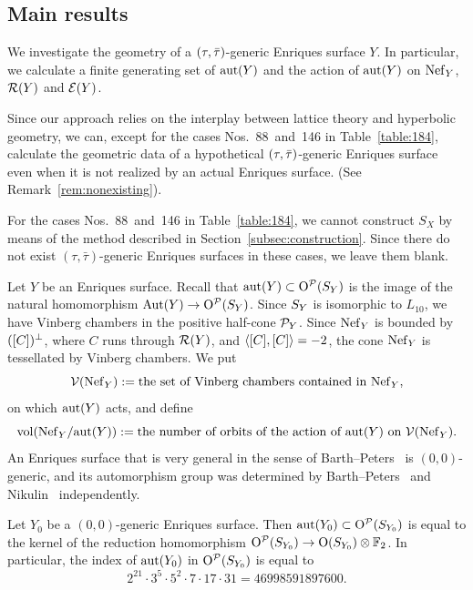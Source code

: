 \documentclass{amsart}
\numberwithin{procedure}{section}
\begin{document}
\subsection{Main results}\label{subsec:mainresults}
%
We investigate the geometry of a $(\tau, \bar{\tau})$-generic Enriques surface $Y$.
In particular, we calculate a finite generating set of $\mathord{\rm{aut}}(Y)$
and the action of $\mathord{\rm{aut}}(Y)$ on $\mathord{\rm Nef}_{Y}$, $\mathord{\mathcal R}(Y)$ and $\mathord{\mathcal E}(Y)$.
%
\begin{remark}\label{rem:nongeometric}
Since our approach relies on the interplay between lattice theory and hyperbolic geometry, %
we can, except for the cases Nos.~88~and~146 in Table~\ref{table:184},
calculate the geometric data of a hypothetical $(\tau, \bar{\tau})$-generic Enriques surface
even when it is not realized by an actual  %
Enriques surface.
(See Remark~\ref{rem:nonexisting}).
\end{remark}
%
\begin{remark}\label{rem:88and146} 
For the cases Nos.~88~and~146 in Table~\ref{table:184},
we cannot construct  $S_X$ by means of the method described in Section~\ref{subsec:construction}.
Since there do not exist $(\tau, \bar\tau)$-generic Enriques surfaces in these cases,
we leave them blank.
\end{remark}
%
Let $Y$ be an Enriques surface.
Recall that $\mathord{\rm{aut}}(Y)\subset  \mathord{\mathrm{O}}^{\mathord{\mathcal P}}(S_{Y})$ 
is the image of the natural homomorphism
$\operatorname{\mathrm{Aut}}\nolimits(Y)\to \mathord{\mathrm{O}}^{\mathord{\mathcal P}}(S_{Y})$.
Since $S_{Y}$ is isomorphic to $L_{10}$,
we have Vinberg chambers in the positive half-cone $\mathord{\mathcal P}_Y$.
Since $\mathord{\rm Nef}_{Y}$ is bounded by
$([C])\sp{\perp}$,
where $C$ runs through $\mathord{\mathcal R}(Y)$, and $\langle [C], [C] \rangle=-2$, 
the cone $\mathord{\rm Nef}_{Y}$ is  tessellated by Vinberg chambers.
We put
\[
\mathord{\mathcal V}(\mathord{\rm Nef}_{Y}):=
\textrm{the set of Vinberg chambers contained in $\mathord{\rm Nef}_{Y}$}, 
\]
on which  $\mathord{\rm{aut}}(Y)$ acts, and define
\[
\mathord{\rm{vol}} (\mathord{\rm Nef}_{Y}/\mathord{\rm{aut}}(Y)):=
\textrm{the number of orbits of the action of $\mathord{\rm{aut}}(Y)$ on 
$\mathord{\mathcal V}(\mathord{\rm Nef}_{Y})$}.
\]
%
An Enriques surface that is very general in the sense of Barth--Peters~\cite{BP1983}
is ${(0,0)}$-generic,
and its automorphism group
was determined by Barth--Peters~\cite{BP1983} and  Nikulin~\cite[Theorem 10.1.2 (c)]{Nikulin1981}
independently.
%
\begin{theorem}\label{thm:BP}
Let $Y_0$ be a ${(0,0)}$-generic Enriques surface.
Then  $\mathord{\rm{aut}}({Y_0})\subset  \mathord{\mathrm{O}}^{\mathord{\mathcal P}}(S_{Y_0})$
is equal to
the kernel of the  reduction homomorphism
$\mathord{\mathrm{O}}^{\mathord{\mathcal P}}(S_{Y_0}) \to \mathord{\mathrm{O}}(S_{Y_0}) \otimes \mathord{\mathbb F}_2$.
In particular,  the index of 
$\mathord{\rm{aut}}(Y_0)$ in  $\mathord{\mathrm{O}}^{\mathord{\mathcal P}}(S_{Y_0})$ is equal to 
%
\begin{equation*}\label{eq:1BP}
2^{21}\cdot 3^5\cdot 5^2\cdot 7 \cdot 17\cdot 31=46998591897600.
\end{equation*}
\end{theorem}
\end{document}
